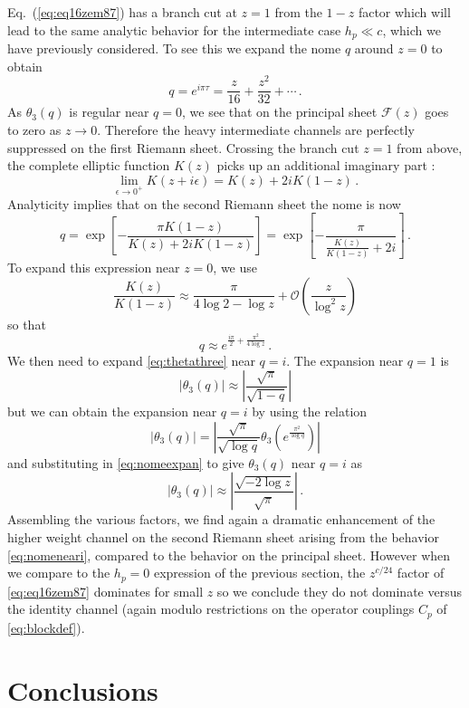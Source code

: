\documentclass{brownthesis}
\begin{document}
Eq.~(\ref{eq:eq16zem87}) has a branch cut at $z=1$ from the $1-z$
factor which will lead to the same analytic behavior for the intermediate
case $h_{p}\ll c$, which we have previously considered. To see this
we expand the nome $q$ around $z=0$ to obtain
\[
q=e^{i\pi\tau}=\frac{z}{16}+\frac{z^{2}}{32}+\cdots\,.
\]
As $\theta_{3}(q)$ is regular near $q=0$, we see that on the principal
sheet $\mathcal{F}(z)$ goes to zero as $z\to0$. Therefore the heavy
intermediate channels are perfectly suppressed on the first Riemann
sheet. Crossing the branch cut $z=1$ from above, the complete elliptic
function $K(z)$ picks up an additional imaginary part \cite{Bogner:2017vim}:
\[
\lim_{\epsilon\to0^{+}}K(z+i\epsilon)=K(z)+2iK(1-z)\,.
\]
Analyticity implies that on the second Riemann sheet the nome is now
\[
q=\exp\left[-\frac{\pi K(1-z)}{K(z)+2iK(1-z)}\right]=\exp\left[-\frac{\pi}{\frac{K(z)}{K(1-z)}+2i}\right]\,.
\]
To expand this expression near $z=0$, we use
\[
\frac{K(z)}{K(1-z)}\approx\frac{\pi}{4\log2-\log z}+\mathcal{O}\left(\frac{z}{\log^{2}z}\right)
\]
so that
\begin{equation}
q\approx e^{\frac{i\pi}{2}+\frac{\pi^{2}}{4\log z}}\,.\label{eq:nomeexpan}
\end{equation}
We then need to expand \eqref{eq:thetathree} near $q=i$. The expansion
near $q=1$ is
\[
\left|\theta_{3}(q)\right|\approx\left|\frac{\sqrt{\pi}}{\sqrt{1-q}}\right|
\]
but we can obtain the expansion near $q=i$ by using the relation
\[
\left|\theta_{3}(q)\right|=\left|\frac{\sqrt{\pi}}{\sqrt{\log q}}\theta_{3}\left(e^{\frac{\pi^{2}}{\log q}}\right)\right|
\]
and substituting in \eqref{eq:nomeexpan} to give $\theta_{3}(q)$
near $q=i$ as
\begin{equation}
\left|\theta_{3}(q)\right|\approx\left|\frac{\sqrt{-2\log z}}{\sqrt{\pi}}\right|\,.\label{eq:nomeneari}
\end{equation}
Assembling the various factors, we find again a dramatic enhancement
of the higher weight channel on the second Riemann sheet arising from
the behavior \eqref{eq:nomeneari}, compared to the behavior on the
principal sheet. However when we compare to the $h_{p}=0$ expression
of the previous section, the $z^{c/24}$ factor of \eqref{eq:eq16zem87}
dominates for small $z$ so we conclude they do not dominate versus
the identity channel (again modulo restrictions on the operator couplings
$C_{p}$ of \eqref{eq:blockdef}).

\section{Conclusions}
\end{document}

